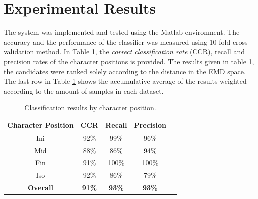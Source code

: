 \documentclass[10pt, conference, compsocconf]{IEEEtran}
\begin{document}
\section{Experimental Results}
\label{sec:experimental_results}

The system was implemented and tested using the Matlab environment.
The accuracy and the performance of the classifier was measured using 10-fold cross-validation method.
In Table \ref{table:results_position}, the \emph{correct classification rate} (CCR), recall and precision rates of the character positions is provided.
The results given in table \ref{table:results_position}, the candidates were ranked solely according to the distance in the EMD space.
The last row in Table \ref{table:results_position} shows the accumulative average of the results weighted according to the amount of samples in each dataset.

\begin{table}
\centering
\begin{tabular}{ | c | c | c | c | c |}
\hline
	\textbf{Character Position} & \textbf{CCR} & \textbf{Recall} &  \textbf{Precision} \\
	\hline 
	Ini & 92\% & 99\% & 96\% \\                
  	\hline
  	Mid & 88\% & 86\% & 94\% \\
  	\hline
  	Fin & 91\% &  100\% & 100\% \\
  	\hline
  	Iso & 92\% &  86\% & 79\% \\
  	\hline
  	\textbf{Overall} & \textbf{91\%} &  \textbf{93\%} & \textbf{93\%} \\
  	\hline
\end{tabular}
\caption{Classification results by character position.}
\label{table:results_position} 
\end{table}
\end{document}
